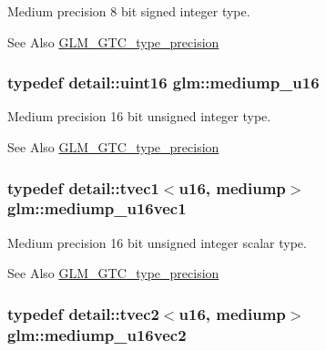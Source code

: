 Medium precision 8 bit signed integer type. \begin{DoxySeeAlso}{See Also}
\hyperlink{group__gtc__type__precision}{G\-L\-M\-\_\-\-G\-T\-C\-\_\-type\-\_\-precision} 
\end{DoxySeeAlso}
\hypertarget{group__gtc__type__precision_ga6745262ef6a6fdb8637b2387ef924828}{
\subsubsection[{mediump\-\_\-u16}]{\setlength{\rightskip}{0pt plus 5cm}typedef detail\-::uint16 {\bf glm\-::mediump\-\_\-u16}}}\label{group__gtc__type__precision_ga6745262ef6a6fdb8637b2387ef924828}
Medium precision 16 bit unsigned integer type. \begin{DoxySeeAlso}{See Also}
\hyperlink{group__gtc__type__precision}{G\-L\-M\-\_\-\-G\-T\-C\-\_\-type\-\_\-precision} 
\end{DoxySeeAlso}
\hypertarget{group__gtc__type__precision_gacb35d25d662b2a6396d094197ca834f0}{
\subsubsection[{mediump\-\_\-u16vec1}]{\setlength{\rightskip}{0pt plus 5cm}typedef detail\-::tvec1$<$u16, mediump$>$ {\bf glm\-::mediump\-\_\-u16vec1}}}\label{group__gtc__type__precision_gacb35d25d662b2a6396d094197ca834f0}
Medium precision 16 bit unsigned integer scalar type. \begin{DoxySeeAlso}{See Also}
\hyperlink{group__gtc__type__precision}{G\-L\-M\-\_\-\-G\-T\-C\-\_\-type\-\_\-precision} 
\end{DoxySeeAlso}
\hypertarget{group__gtc__type__precision_ga93fe5ddc21391f0334eb3a60b76c390b}{
\subsubsection[{mediump\-\_\-u16vec2}]{\setlength{\rightskip}{0pt plus 5cm}typedef detail\-::tvec2$<$u16, mediump$>$ {\bf glm\-::mediump\-\_\-u16vec2}}}\label{group__gtc__type__precision_ga93fe5ddc21391f0334eb3a60b76c390b}
